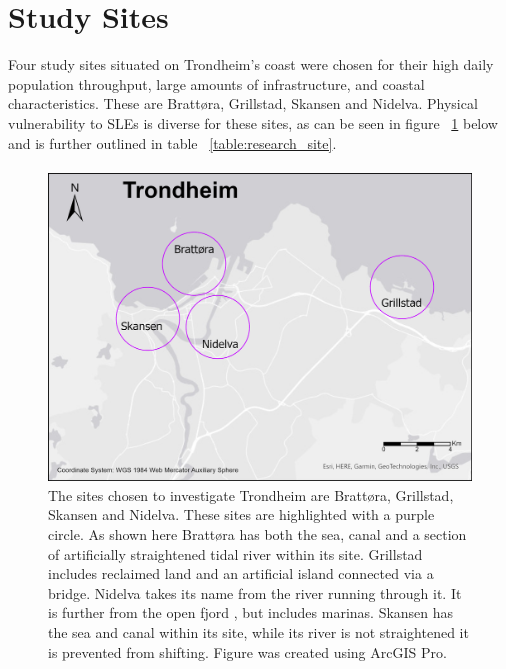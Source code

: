 \section{Study Sites} \label{study-sites-background}
Four study sites situated on Trondheim's coast were chosen for their high daily population throughput, large amounts of infrastructure, and coastal characteristics. These are Brattøra, Grillstad, Skansen and Nidelva. Physical vulnerability to SLEs is diverse for these sites, as can be seen in figure ~\ref{fig:research_site} below and is further outlined in table ~\ref{table:research_site}. 
\paragraph{}

\begin{figure} [H]
    \centering
    \includegraphics[width=1.0\textwidth]{fig/trondheim_research_sites_grey_circles.png}
    \caption[Research sites - Trondheim]{The sites chosen to investigate Trondheim are Brattøra, Grillstad, Skansen and Nidelva. These sites are highlighted with a purple circle. As shown here Brattøra has both the sea, canal and a section of artificially straightened tidal river within its site. Grillstad includes reclaimed land and an artificial island connected via a bridge. Nidelva takes its name from the river running through it. It is further from the open fjord , but includes marinas. Skansen has the sea and canal within its site, while its river is not straightened it is prevented from shifting. Figure was created using ArcGIS Pro.}
    \label{fig:research_site}
\end{figure}

